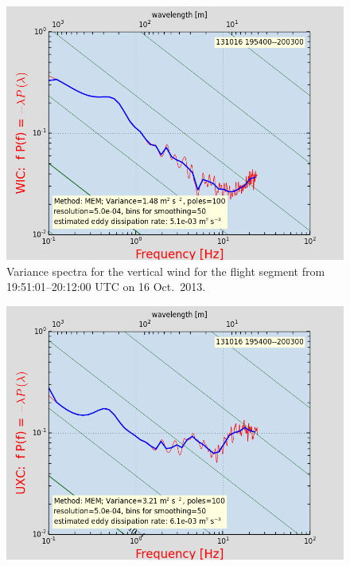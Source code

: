 \documentclass[12pt,twoside,english]{article}\usepackage[]{graphicx}\usepackage[]{color}
\let\OrgIndex\index
\renewcommand*{\index}[1]{\OrgIndex{#1}}
\begin{document}
{{\begin{appendices}

\begin{figure}
\noindent \begin{centering}
\includegraphics[height=0.4\textheight]{SpecialGraphics/PSD1.png}  
\par\end{centering}

\protect\protect\protect\caption{\label{fig:AppxB-PSD1}Variance spectra for the vertical wind for the flight segment from 19:51:01--20:12:00 UTC on 16 Oct.\ 2013.} 
\end{figure}
\begin{figure}
\noindent \begin{centering}
\includegraphics[height=0.4\textheight]{SpecialGraphics/PSD2.png}  
\par\end{centering}


\end{figure}
\end{appendices}}}
\end{document}
